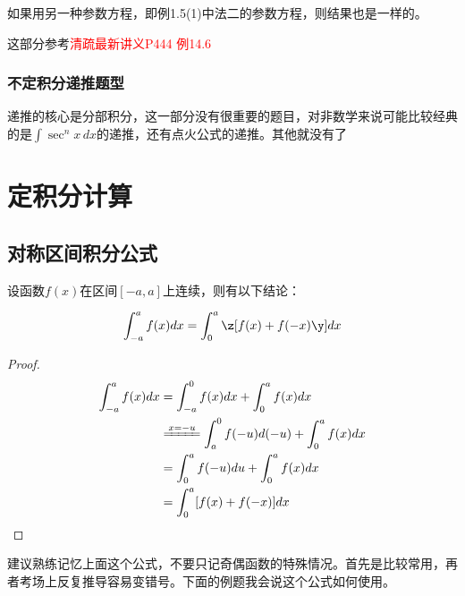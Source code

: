 \begin{remark}
如果用另一种参数方程，即例1.5(1)中法二的参数方程，则结果也是一样的。

这部分参考\textcolor{red}{清疏最新讲义P444 例14.6}
\end{remark}


\subsubsection{ 不定积分递推题型 }
递推的核心是分部积分，这一部分没有很重要的题目，对非数学来说可能比较经典的是$ \int \sec^n x \,dx $的递推，还有点火公式的递推。其他就没有了

\newpage











\section{定积分计算}

\subsection{对称区间积分公式}

\begin{theorem}[对称区间计算公式]
设函数$f(x)$在区间$[-a,a]$上连续，则有以下结论：

\[ \int_{-a}^{a} f(x) dx = \int_{0}^{a} \z[f(x) + f(-x) \y] dx \]
\end{theorem}

\begin{proof}
\begin{align*}
\int_{-a}^{a} f(x) dx &= \int_{-a}^{0} f(x) dx + \int_{0}^{a} f(x) dx \\
&\xlongequal{x = -u} \int_{a}^{0} f(-u) d(-u) + \int_{0}^{a} f(x) dx \\
&= \int_{0}^{a} f(-u) du + \int_{0}^{a} f(x) dx \\
&= \int_{0}^{a} [f(x) + f(-x)] dx
\end{align*}
\end{proof}
\begin{remark}
建议熟练记忆上面这个公式，不要只记奇偶函数的特殊情况。首先是比较常用，再者考场上反复推导容易变错号。下面的例题我会说这个公式如何使用。
\end{remark}

